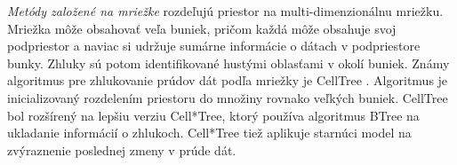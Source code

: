 \textit{Metódy založené na mriežke}
rozdeľujú priestor na multi-dimenzionálnu mriežku. Mriežka môže obsahovať veľa buniek, pričom každá môže obsahuje svoj podpriestor a naviac si udržuje sumárne informácie o dátach v podpriestore bunky. Zhluky sú potom identifikované hustými oblasťami v okolí buniek. Známy algoritmus pre zhlukovanie prúdov dát podľa mriežky je CellTree \citep{han2011data}. Algoritmus je inicializovaný rozdelením priestoru do množiny rovnako veľkých buniek. CellTree bol rozšírený na lepšiu verziu Cell*Tree, ktorý používa algoritmus BTree na ukladanie informácií o zhlukoch. Cell*Tree tiež aplikuje starnúci model na zvýraznenie poslednej zmeny v prúde dát.



